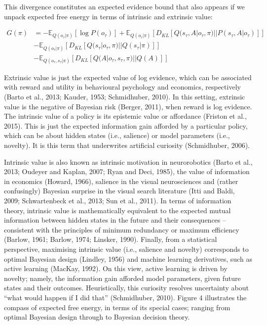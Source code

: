 \documentclass{article}
\theoremstyle{plain}
\theoremstyle{definition}
\theoremstyle{proposition}
\theoremstyle{corollary}
\theoremstyle{lemma}
\theoremstyle{remark}
\theoremstyle{example}
\begin{document}
This divergence constitutes an expected evidence bound that also appears if we unpack expected free energy in terms of intrinsic and extrinsic value:

\begin{equation}
\begin{split}
       G(\pi) &= -\mathbb E_{Q(o_\tau |\pi)}[\log P(o_\tau)]+ \mathbb E_{Q(o_\tau|\pi)}[D_{KL}[Q(s_\tau, A|o_\tau, \pi)||P(s_\tau, A|o_\tau)]] \\
       &-\mathbb E_{Q(o_\tau|\pi)}[D_{KL}[Q(s_\tau|o_\tau, \pi)||Q(s_\tau |\pi)]]\\ &-\mathbb E_{Q(o_\tau,s_\tau|\pi)}[D_{KL}[Q(A|o_\tau, s_\tau, \pi)||Q(A)]]
\end{split}
\end{equation}

Extrinsic value is just the expected value of log evidence, which can be associated with reward and utility in behavioural psychology and economics, respectively (Barto et al., 2013; Kauder, 1953; Schmidhuber, 2010). In this setting, extrinsic value is the negative of Bayesian risk (Berger, 2011), when reward is log evidence. The intrinsic value of a policy is its epistemic value or affordance (Friston et al., 2015). This is just the expected information gain afforded by a particular policy, which can be about hidden states (i.e., salience) or model parameters (i.e., novelty). It is this term that underwrites artificial curiosity (Schmidhuber, 2006).

Intrinsic value is also known as intrinsic motivation in neurorobotics (Barto et al., 2013; Oudeyer and Kaplan, 2007; Ryan and Deci, 1985), the value of information in economics (Howard, 1966), salience in the visual neurosciences and (rather confusingly) Bayesian surprise in the visual search literature (Itti and Baldi, 2009; Schwartenbeck et al., 2013; Sun et al., 2011). In terms of information theory, intrinsic value is mathematically equivalent to the expected mutual information between hidden states in the future and their consequences – consistent with the principles of minimum redundancy or maximum efficiency (Barlow, 1961; Barlow, 1974; Linsker, 1990). Finally, from a statistical perspective, maximising intrinsic value (i.e., salience and novelty) corresponds to optimal Bayesian design (Lindley, 1956) and machine learning derivatives, such as active learning (MacKay, 1992). On this view, active learning is driven by novelty; namely, the information gain afforded model parameters, given future states and their outcomes. Heuristically, this curiosity resolves uncertainty about “what would happen if I did that” (Schmidhuber, 2010). Figure 4 illustrates the compass of expected free energy, in terms of its special cases; ranging from optimal Bayesian design through to Bayesian decision theory.
\end{document}
